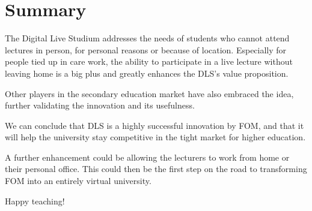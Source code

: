 %
%

\pagebreak
\section{Summary}

\onehalfspacing

The Digital Live Studium addresses the needs of students who cannot attend lectures in person, for personal reasons or because of location. Especially for people tied up in care work, the ability to participate in a live lecture without leaving home is a big plus and greatly enhances the DLS's value proposition.

Other players in the secondary education market have also embraced the idea, further validating the innovation and its usefulness.

We can conclude that DLS is a highly successful innovation by FOM, and that it will help the university stay competitive in the tight market for higher education.

A further enhancement could be allowing the lecturers to work from home or their personal office. This could then be the first step on the road to transforming FOM into an entirely virtual university.

Happy teaching!
